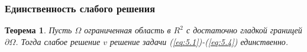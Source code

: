 \documentclass[10pt, pdf, hyperref={unicode}]{beamer}
\newtheorem{ru_theo}{Теорема}
\renewenvironment{theorem}{\begin{ru_theo}}{\end{ru_theo}}
\begin{document}
    \begin{frame}
    \frametitle{Единственность слабого решения}
    \begin{center}
      \begin{minipage}[h]{0.97\linewidth}
        \begin{theorem}
          Пусть $\Omega$ ограниченная область в $R^2$ с достаточно гладкой границей $\partial\Omega$. Тогда слабое решение $v$  решение
          задачи (\ref{eq:5.1})-(\ref{eq:5.4}) единственно.
        \end{theorem}
      \end{minipage}
    \end{center}
  \end{frame}


\end{document}

